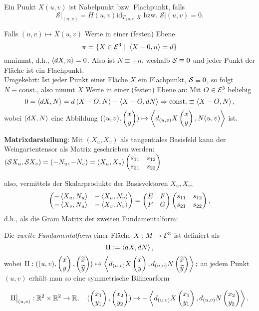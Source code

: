 \begin{remark}
	
	Ein Punkt $X(u,v)$ ist Nabelpunkt bzw. Flachpunkt, falls
	\[ \mathcal{S}\big|_{(u,v)} = H(u,v)\mathrm{id}_{T_{(u,v)}X} \text{ bzw. } \mathcal{S}\big|{(u,v)}=0. \]
	
\end{remark}

\begin{example}\label{Ex:Flachpunkt}
	
	Falls $  (u,v) \mapsto X(u,v) $ Werte in einer (festen) Ebene
		\[ \pi = \{ X \in \mathcal E^3 ~|~ \left \langle X-0,n \right\rangle = d \} \] 
	annimmt, d.h., $ \left \langle dX,n \right\rangle=0 $. Also ist $ N \equiv \pm n $, weshalb $\mathcal S \equiv 0$ und jeder Punkt der Fläche ist ein Flachpunkt.\\
	Umgekehrt: Ist jeder Punkt einer Fläche $ X $ ein Flachpunkt, $ \mathcal S \equiv 0 $, so folgt $ N \equiv \mathrm{const.} $, also nimmt $ X $ Werte in einer (festen) Ebene an: Mit $ O \in \mathcal E^3 $ beliebig \[ 0 = \left \langle dX,N \right\rangle = d\left \langle X-O,N \right\rangle - \left \langle X-O,dN \right\rangle \Rightarrow \mathrm{const.} \equiv \left \langle X-O,N \right\rangle, \] wobei $ \left \langle dX,N \right\rangle $ eine Abbildung $ ((u,v), \begin{pmatrix} x \\ y \end{pmatrix}) \mapsto \left \langle d_{(u,v)}X\begin{pmatrix} x\\y \end{pmatrix},N(u,v) \right\rangle $ ist.

	\textbf{Matrixdarstellung}: Mit $(X_u,X_v)$ als tangentiales Basisfeld kann der Weingartentensor als Matrix geschrieben werden:
	$ (\mathcal S X_u, \mathcal S X_v) = (-N_u, -N_v) = (X_u,X_v) \begin{pmatrix} s_{11} & s_{12} \\ s_{21} & s_{22} \end{pmatrix} $
	
	also, vermittels der Skalarprodukte der Basisvektoren $ X_u,X_v $, 
	\[\begin{pmatrix} -\left \langle X_u,N_u \right\rangle & - \left \langle X_u,N_v \right\rangle \\ - \left \langle X_v,N_u \right\rangle & - \left \langle X_v,N_v \right\rangle  \end{pmatrix} = \begin{pmatrix} E &F \\ F &G \end{pmatrix} \begin{pmatrix} s_{11} & s_{12} \\ s_{21} & s_{22} \end{pmatrix}, \] d.h., als die Gram Matrix der zweiten Fundamentalform:
	
	
\end{example}

\begin{lemma, definition}
	 Die \emph{zweite Fundamentalform} einer Fläche $ X: M \rightarrow \mathcal E^3 $ ist definiert als \[ \mathrm{II} := \left \langle dX,dN \right\rangle, \] wobei $ \mathrm{II}: ((u,v), \begin{pmatrix} x \\ y \end{pmatrix},\begin{pmatrix} \widetilde{x} \\ \widetilde{y} \end{pmatrix}) \mapsto \left \langle d_{(u,v)}X \begin{pmatrix} x\\y \end{pmatrix},d_{(u,v)}N \begin{pmatrix} \widetilde{x}\\\widetilde{y} \end{pmatrix} \right\rangle; $
	 an jedem Punkt $ (u,v) $ erhält man so eine symmetrische Bilinearform 
	 
	 \[ \mathrm{II}\big|_{(u,v)}: \mathbb R^2 \times \mathbb R^2 \rightarrow \mathbb R, \quad (\begin{pmatrix} x_1 \\ y_1 \end{pmatrix},\begin{pmatrix} x_2 \\ y_2 \end{pmatrix}) \mapsto - \left \langle d_{(u,v)}X\begin{pmatrix} x_1 \\ y_1 \end{pmatrix},d_{(u,v)}N\begin{pmatrix} x_2 \\ y_2 \end{pmatrix} \right\rangle. \]
	 
\end{lemma, definition}

